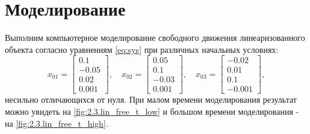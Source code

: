 \section{Моделирование}

Выполним компьютерное моделирование свободного движения линеаризованного
объекта согласно уравнениям \eqref{eq:sys} при различных начальных условиях:
\begin{equation*}
    x_{01}=\begin{bmatrix}
        0.1\\
        -0.05\\
        0.02\\
        0.001
    \end{bmatrix},\quad
    x_{02}=\begin{bmatrix}
        0.05\\
         0.1\\
         -0.03\\
         0.001
    \end{bmatrix},\quad
    x_{03}=\begin{bmatrix}
        -0.02\\
        0.01\\
         0.1\\
         -0.001
    \end{bmatrix},
\end{equation*}
несильно отличающихся от нуля. При малом времени
моделирования результат можно увидеть на \autoref{fig:2.3.lin_free_t_low} 
и большом времени моделирования - на \autoref{fig:2.3.lin_free_t_high}.


